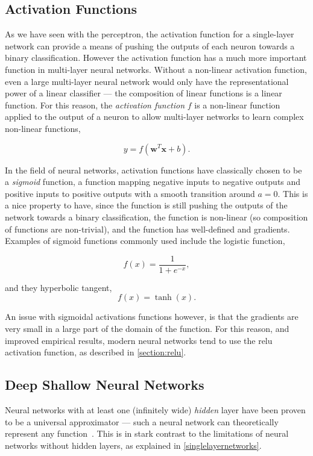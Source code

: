 \documentclass[thesis]{subfiles}
\begin{document}
\subsection{Activation Functions}
As we have seen with the perceptron, the activation function for a single-layer network can provide a means of pushing the outputs of each neuron towards a binary classification. However the activation function has a much more important function in multi-layer neural networks. Without a non-linear activation function, even a large multi-layer neural network would only have the representational power of a linear classifier --- the composition of linear functions is a linear function. For this reason, the \emph{activation function} $f$ is a non-linear function applied to the output of a neuron to allow multi-layer networks to learn complex non-linear functions,

\begin{equation}
y = f\left(\mathbf{w}^T\mathbf{x} + b\right).
\end{equation}

In the field of neural networks, activation functions have classically chosen to be a \emph{sigmoid} function, \ie{}a function mapping negative inputs to negative outputs and positive inputs to positive outputs with a smooth transition around $a = 0$. This is a nice property to have, since the function is still pushing the outputs of the network towards a binary classification, the function is non-linear (so composition of functions are non-trivial), and the function has well-defined and gradients. Examples of sigmoid functions commonly used include the logistic function, 

\begin{equation}
	f(x) = \frac{1}{1+e^{-x}},
\end{equation}

and they hyperbolic tangent,
\begin{equation}
	f(x) = \tanh(x).
\end{equation}

An issue with sigmoidal activations functions however, is that the gradients are very small in a large part of the domain of the function. For this reason, and improved empirical results, modern neural networks tend to use the \gls{relu} activation function, as described in \cref{section:relu}.


\subsection{Deep \vs Shallow Neural Networks}
Neural networks with at least one (infinitely wide) \emph{hidden} layer have been proven to be a universal approximator --- \ie such a neural network can theoretically represent any function~\citep{journals/mcss/Cybenko92,hornik89a}. This is in stark contrast to the limitations of neural networks without hidden layers, as explained in \cref{singlelayernetworks}.
\end{document}
